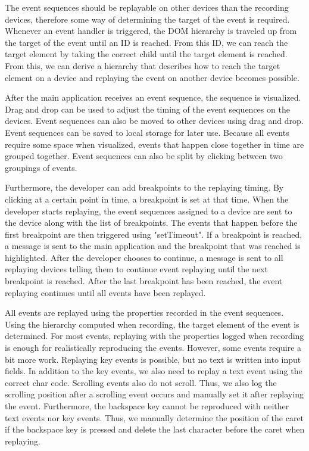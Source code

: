 The event sequences should be replayable on other devices than the recording devices, therefore some way of determining the target of the event is required. Whenever an event handler is triggered, the DOM hierarchy is traveled up from the target of the event until an ID is reached. From this ID, we can reach the target element by taking the correct child until the target element is reached. From this, we can derive a hierarchy that describes how to reach the target element on a device and replaying the event on another device becomes possible.

After the main application receives an event sequence, the sequence is visualized. Drag and drop can be used to adjust the timing of the event sequences on the devices. Event sequences can also be moved to other devices using drag and drop. Event sequences can be saved to local storage for later use. Because all events require some space when visualized, events that happen close together in time are grouped together. Event sequences can also be split by clicking between two groupings of events.

Furthermore, the developer can add breakpoints to the replaying timing. By clicking at a certain point in time, a breakpoint is set at that time. When the developer starts replaying, the event sequences assigned to a device are sent to the device along with the list of breakpoints. The events that happen before the first breakpoint are then triggered using "setTimeout". If a breakpoint is reached, a message is sent to the main application and the breakpoint that was reached is highlighted. After the developer chooses to continue, a message is sent to all replaying devices telling them to continue event replaying until the next breakpoint is reached. After the last breakpoint has been reached, the event replaying continues until all events have been replayed. 

All events are replayed using the properties recorded in the event sequences. Using the hierarchy computed when recording, the target element of the event is determined. For most events, replaying with the properties logged when recording is enough for realistically reproducing the events. However, some events require a bit more work. Replaying key events is possible, but no text is written into input fields. In addition to the key events, we also need to replay a text event using the correct char code. Scrolling events also do not scroll. Thus, we also log the scrolling position after a scrolling event occurs and manually set it after replaying the event. Furthermore, the backspace key cannot be reproduced with neither text events nor key events. Thus, we manually determine the position of the caret if the backspace key is pressed and delete the last character before the caret when replaying. 

